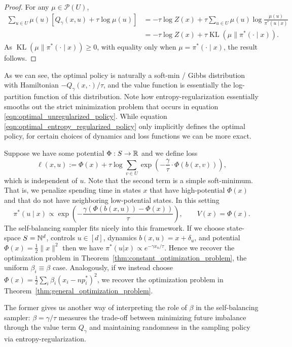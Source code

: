 \begin{subappendices}
\begin{proof}
For any $\mu\in\mathcal P(U)$,
\begin{align*}
\sum_{u\in U}\mu(u)\left[Q_\gamma(x,u)+\tau\log\mu(u)\right]
&=-\tau\log Z(x)
+\tau\sum_{u\in U}\mu(u)\log\frac{\mu(u)}{\pi^*(u\mid x)}\\
&=-\tau\log Z(x)+\tau\operatorname{KL}(\mu\|\pi^*(\cdot\mid x)).
\end{align*}
As $\operatorname{KL}(\mu\|\pi^*(\cdot\mid x)) \geq 0$, with equality 
only when $\mu=\pi^*(\cdot\mid x)$, the result follows.
\end{proof}

\noindent As we can see, the optimal policy is naturally a soft-min / Gibbs distribution with Hamiltonian $-Q_\gamma(x, \cdot ) / \tau$, and the value function
is essentially the log-partition function of this distribution. Note how entropy-regularization essentially smooths out
the strict minimization problem that occurs in equation \eqref{eqn:optimal_unregularized_policy}. While
 equation \eqref{eqn:optimal_entropy_regularized_policy} only implicitly defines the optimal policy, 
 for certain choices of dynamics and loss functions we can be more exact. 

Suppose we have some potential $\Phi:S \to \mathbb{R}$ and we define loss
%
\[\ell(x, u)  := \Phi(x) +  \tau \log \sum_{v \in U} \exp\left(-\frac{\gamma}{\tau} \cdot \Phi(b(x,v))\right),\]
%
\noindent which is independent of $u$. Note that the second term is a simple soft-minimum. That is, we penalize spending time in states $x$ that have high-potential $\Phi(x)$ and that do not have neighboring low-potential states. In this setting
%
\[\pi^*( u \mid x) \propto \exp\left(- \frac{\gamma(\Phi(b(x,u)) - \Phi(x))}{\tau}\right), \qquad V(x) = \Phi(x).\]
%
The self-balancing sampler fits nicely into this framework. If we choose state-space $S = \mathbb{N}^d$, controls $u \in [d]$, dynamics $b(x,u) = x + \delta_u $, and potential $\Phi(x) = \frac{1}{2}\|x\|^2$ then we have $\pi^*(u | x) \propto e^{-\gamma x_u/\tau}$. Hence we recover the optimization problem in Theorem~\ref{thm:constant_optimization_problem}, the uniform $\beta_i \equiv \beta$ case. Analogously, if we instead choose $\Phi(x) = \frac{1}{2} \sum_i \beta_i(x_i - np_i^*)^2$, we recover the optimization problem in Theorem~\ref{thm:general_optimization_problem}.

The former gives us another way of interpreting the role of $\beta$ in the self-balancing sampler: $\beta = \gamma / \tau$ measures the trade-off between minimizing future imbalance through the value term $Q_\gamma$ and maintaining randomness in the sampling policy via entropy-regularization.


\end{subappendices}
